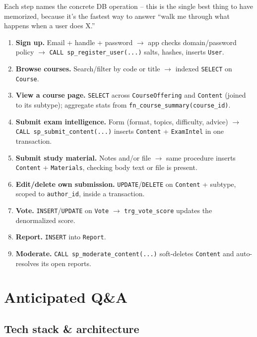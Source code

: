 \documentclass[11pt]{article}
\begin{document}
Each step names the concrete DB operation -- this is the single best thing to have memorized, because it's the fastest way to answer ``walk me through what happens when a user does X.''

\begin{enumerate}[leftmargin=1.8em]
  \item \textbf{Sign up.} Email + handle + password $\rightarrow$ app checks domain/password policy $\rightarrow$ \texttt{CALL sp\_register\_user(...)} salts, hashes, inserts \texttt{User}.
  \item \textbf{Browse courses.} Search/filter by code or title $\rightarrow$ indexed \texttt{SELECT} on \texttt{Course}.
  \item \textbf{View a course page.} \texttt{SELECT} across \texttt{CourseOffering} and \texttt{Content} (joined to its subtype); aggregate stats from \texttt{fn\_course\_summary(course\_id)}.
  \item \textbf{Submit exam intelligence.} Form (format, topics, difficulty, advice) $\rightarrow$ \texttt{CALL sp\_submit\_content(...)} inserts \texttt{Content} + \texttt{ExamIntel} in one transaction.
  \item \textbf{Submit study material.} Notes and/or file $\rightarrow$ same procedure inserts \texttt{Content} + \texttt{Materials}, checking body text or file is present.
  \item \textbf{Edit/delete own submission.} \texttt{UPDATE}/\texttt{DELETE} on \texttt{Content} + subtype, scoped to \texttt{author\_id}, inside a transaction.
  \item \textbf{Vote.} \texttt{INSERT}/\texttt{UPDATE} on \texttt{Vote} $\rightarrow$ \texttt{trg\_vote\_score} updates the denormalized score.
  \item \textbf{Report.} \texttt{INSERT} into \texttt{Report}.
  \item \textbf{Moderate.} \texttt{CALL sp\_moderate\_content(...)} soft-deletes \texttt{Content} and auto-resolves its open reports.
\end{enumerate}

\section{Anticipated Q\&A}

\subsection{Tech stack \& architecture}
\end{document}

